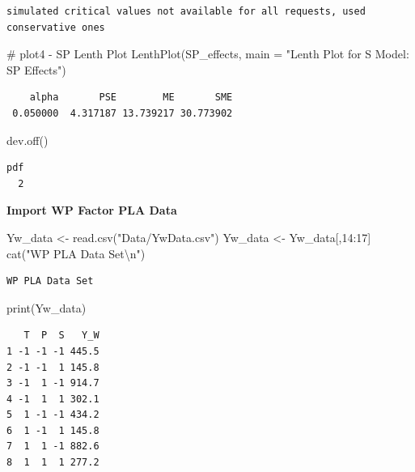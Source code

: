 \documentclass[
  letterpaper,
  DIV=11,
  numbers=noendperiod]{scrartcl}
\newenvironment{Shaded}{\begin{snugshade}}{\end{snugshade}}
\newcommand{\AttributeTok}[1]{\textcolor[rgb]{0.40,0.45,0.13}{#1}}
\newcommand{\CommentTok}[1]{\textcolor[rgb]{0.37,0.37,0.37}{#1}}
\newcommand{\DecValTok}[1]{\textcolor[rgb]{0.68,0.00,0.00}{#1}}
\newcommand{\FunctionTok}[1]{\textcolor[rgb]{0.28,0.35,0.67}{#1}}
\newcommand{\NormalTok}[1]{\textcolor[rgb]{0.00,0.23,0.31}{#1}}
\newcommand{\OtherTok}[1]{\textcolor[rgb]{0.00,0.23,0.31}{#1}}
\newcommand{\SpecialCharTok}[1]{\textcolor[rgb]{0.37,0.37,0.37}{#1}}
\newcommand{\StringTok}[1]{\textcolor[rgb]{0.13,0.47,0.30}{#1}}
\begin{document}
\begin{verbatim}
simulated critical values not available for all requests, used conservative ones
\end{verbatim}

\begin{Shaded}
\begin{Highlighting}[]
\CommentTok{\# plot4 {-} SP Lenth Plot}
\FunctionTok{LenthPlot}\NormalTok{(SP\_effects, }\AttributeTok{main =} \StringTok{"Lenth Plot for S Model: SP Effects"}\NormalTok{)}
\end{Highlighting}
\end{Shaded}

\begin{verbatim}
    alpha       PSE        ME       SME 
 0.050000  4.317187 13.739217 30.773902 
\end{verbatim}

\begin{Shaded}
\begin{Highlighting}[]
\FunctionTok{dev.off}\NormalTok{()}
\end{Highlighting}
\end{Shaded}

\begin{verbatim}
pdf 
  2 
\end{verbatim}

\textbf{Import WP Factor PLA Data }

\begin{Shaded}
\begin{Highlighting}[]
\NormalTok{Yw\_data }\OtherTok{\textless{}{-}} \FunctionTok{read.csv}\NormalTok{(}\StringTok{"Data/YwData.csv"}\NormalTok{)}
\NormalTok{Yw\_data }\OtherTok{\textless{}{-}}\NormalTok{ Yw\_data[,}\DecValTok{14}\SpecialCharTok{:}\DecValTok{17}\NormalTok{]}
\FunctionTok{cat}\NormalTok{(}\StringTok{"WP PLA Data Set}\SpecialCharTok{\textbackslash{}n}\StringTok{"}\NormalTok{)}
\end{Highlighting}
\end{Shaded}

\begin{verbatim}
WP PLA Data Set
\end{verbatim}

\begin{Shaded}
\begin{Highlighting}[]
\FunctionTok{print}\NormalTok{(Yw\_data)}
\end{Highlighting}
\end{Shaded}

\begin{verbatim}
   T  P  S   Y_W
1 -1 -1 -1 445.5
2 -1 -1  1 145.8
3 -1  1 -1 914.7
4 -1  1  1 302.1
5  1 -1 -1 434.2
6  1 -1  1 145.8
7  1  1 -1 882.6
8  1  1  1 277.2
\end{verbatim}
\end{document}
